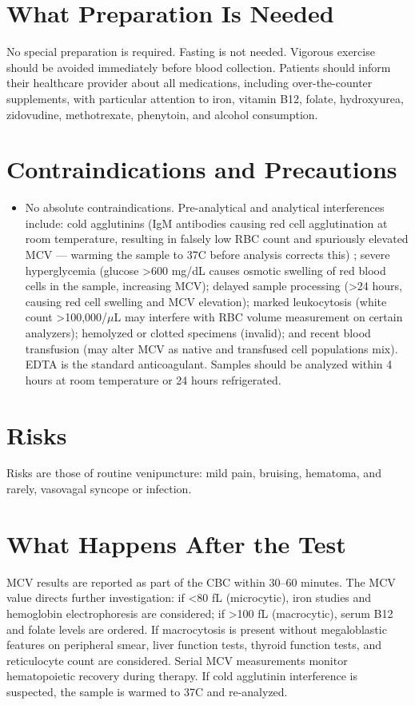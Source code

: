 \section*{What Preparation Is Needed}
No special preparation is required. Fasting is not needed. Vigorous exercise should be avoided immediately before blood collection. Patients should inform their healthcare provider about all medications, including over-the-counter supplements, with particular attention to iron, vitamin B12, folate, hydroxyurea, zidovudine, methotrexate, phenytoin, and alcohol consumption.

\section*{Contraindications and Precautions}
\begin{itemize}
  \item No absolute contraindications. Pre-analytical and analytical interferences include: cold agglutinins (IgM antibodies causing red cell agglutination at room temperature, resulting in falsely low RBC count and spuriously elevated MCV --- warming the sample to 37\textdegree{}C before analysis corrects this) \cite{wallach2022interpretation}; severe hyperglycemia (glucose >600 mg/dL causes osmotic swelling of red blood cells in the sample, increasing MCV); delayed sample processing (>24 hours, causing red cell swelling and MCV elevation); marked leukocytosis (white count >100,000/$\mu$L may interfere with RBC volume measurement on certain analyzers); hemolyzed or clotted specimens (invalid); and recent blood transfusion (may alter MCV as native and transfused cell populations mix). EDTA is the standard anticoagulant. Samples should be analyzed within 4 hours at room temperature or 24 hours refrigerated.
\end{itemize}
\section*{Risks}
Risks are those of routine venipuncture: mild pain, bruising, hematoma, and rarely, vasovagal syncope or infection.

\section*{What Happens After the Test}
MCV results are reported as part of the CBC within 30--60 minutes. The MCV value directs further investigation: if <80 fL (microcytic), iron studies and hemoglobin electrophoresis are considered; if >100 fL (macrocytic), serum B12 and folate levels are ordered. If macrocytosis is present without megaloblastic features on peripheral smear, liver function tests, thyroid function tests, and reticulocyte count are considered. Serial MCV measurements monitor hematopoietic recovery during therapy. If cold agglutinin interference is suspected, the sample is warmed to 37\textdegree{}C and re-analyzed.

